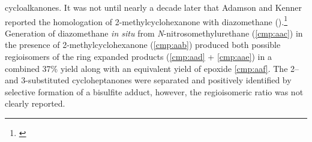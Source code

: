 cycloalkanones. It was not until nearly a decade later that Adamson and
Kenner reported the homologation of 2-methylcyclohexanone with
diazomethane ().\footnote{ \label{ref:adamsonkenner}} Generation of
diazomethane
\textit{in situ} from \textit{N}-nitrosomethylurethane
(\ref{cmp:aac}) in the presence of 2-methylcyclohexanone (\ref{cmp:aab}) produced both possible
regioisomers of the ring expanded products (\ce{->}\ref{cmp:aad} + \ref{cmp:aae}) in a combined 37\%
yield along with an equivalent yield of epoxide \ref{cmp:aaf}. The 2-- and 3-substituted
cycloheptanones were separated and positively identified by selective formation
of a bisulfite adduct, however, the regioisomeric ratio was not clearly
reported.


